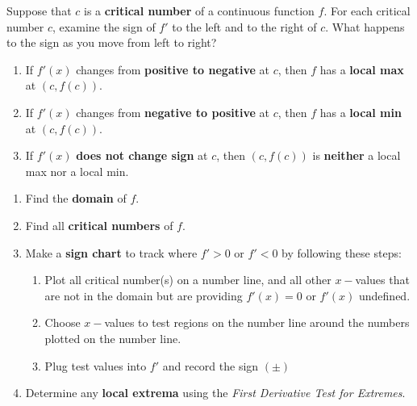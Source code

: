 \newpage
\begin{tcolorbox}[title = {The First Derivative Test for Extremes:}]

Suppose that $c$ is a \textbf{critical number} of a continuous function $f$. For each critical number $c$, examine the sign of $f'$ to the left and to the right of $c$. What happens to the sign as you move from left to right?
\renewcommand{\labelenumi}{(\alph{enumi})}
\begin{enumerate}[leftmargin=*]

    \item If $f'(x)$ changes from \textbf{positive to negative} at $c$, then $f$ has a \textbf{local max} at $(c,f(c))$.
    \item If $f'(x)$ changes from \textbf{negative to positive} at $c$, then $f$ has a \textbf{local min} at $(c,f(c))$.
    \item If $f'(x)$ \textbf{does not change sign} at $c$, then $(c,f(c))$ is \textbf{neither} a local max nor a local min.
\end{enumerate}
\end{tcolorbox}

\begin{tcolorbox}[title={Steps for finding where $f$ is Increasing/Decreasing or any Local Extrema}]
\begin{enumerate}[leftmargin=*]
    \item Find the \textbf{domain} of $f$.
    \item Find all \textbf{critical numbers} of $f$.
    \item Make a \textbf{sign chart} to track where $f'>0$ or $f'<0$ by following these steps:
    \renewcommand{\labelenumii}{(\roman{enumii})}
    \begin{enumerate}
        \item Plot all critical number(s) on a number line, and all other $x-$values that are not in the domain but are providing $f'(x)=0$ or $f'(x)$ undefined.
        \item Choose $x-$values to test regions on the number line around the numbers plotted on the number line.
        \item Plug test values into $f'$ and record the sign $(\pm)$
    \end{enumerate}
    \item Determine any \textbf{local extrema} using the \emph{First Derivative Test for Extremes}.
\end{enumerate}
\end{tcolorbox}


